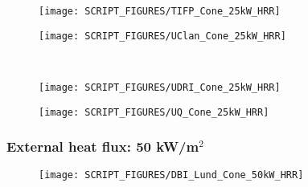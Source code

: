 \vfill
\newpage
\noindent
\begin{minipage}{0.5\textwidth}
\begin{figure}[H]
{\texttt{[image: SCRIPT\_FIGURES/TIFP\_Cone\_25kW\_HRR]}}\\
\end{figure}
\end{minipage}
\begin{minipage}{0.35\textwidth}
\begin{figure}[H]
{\texttt{[image: SCRIPT\_FIGURES/UClan\_Cone\_25kW\_HRR]}}\\
\end{figure}
\end{minipage}\\
\begin{minipage}{0.5\textwidth}
\begin{figure}[H]
{\texttt{[image: SCRIPT\_FIGURES/UDRI\_Cone\_25kW\_HRR]}}\\
\end{figure}
\end{minipage}
\begin{minipage}{0.35\textwidth}
\begin{figure}[H]
{\texttt{[image: SCRIPT\_FIGURES/UQ\_Cone\_25kW\_HRR]}}\\
\end{figure}
\end{minipage}
\vfill
\subsubsection{External heat flux: 50 kW/m$^2$}
\begin{minipage}{0.5\textwidth}
\begin{figure}[H]
{\texttt{[image: SCRIPT\_FIGURES/DBI\_Lund\_Cone\_50kW\_HRR]}}\\
\end{figure}
\end{minipage}
\vfill

\newpage
